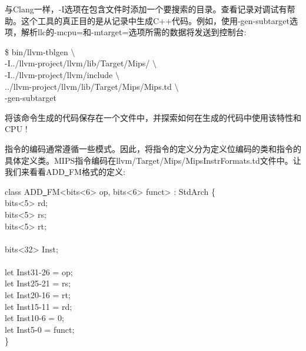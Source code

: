 与Clang一样，-I选项在包含文件时添加一个要搜索的目录。查看记录对调试有帮助。这个工具的真正目的是从记录中生成C++代码。例如，使用-gen-subtarget选项，解析llc的-mcpu=和-mtarget=选项所需的数据将发送到控制台:\par

\begin{tcolorbox}[colback=white,colframe=black]
\$ bin/llvm-tblgen $\setminus$ \\
\hspace*{0.5cm}-I../llvm-project/llvm/lib/Target/Mips/ $\setminus$ \\
\hspace*{0.5cm}-I../llvm-project/llvm/include $\setminus$ \\
\hspace*{0.5cm}../llvm-project/llvm/lib/Target/Mips/Mips.td $\setminus$ \\
\hspace*{0.5cm}-gen-subtarget
\end{tcolorbox}

将该命令生成的代码保存在一个文件中，并探索如何在生成的代码中使用该特性和CPU !\par

指令的编码通常遵循一些模式。因此，将指令的定义分为定义位编码的类和指令的具体定义类。MIPS指令编码在llvm/Target/Mips/MipsInstrFormats.td文件中。让我们来看看ADD\underline{~}FM格式的定义:\par

\begin{tcolorbox}[colback=white,colframe=black]
class ADD\underline{~}FM<bits<6> op, bits<6> funct> : StdArch \{ \\
\hspace*{0.5cm}	bits<5> rd; \\
\hspace*{0.5cm}	bits<5> rs; \\
\hspace*{0.5cm}	bits<5> rt; \\
\\
\hspace*{0.5cm}	bits<32> Inst; \\
\\
\hspace*{0.5cm}	let Inst{31-26} = op; \\
\hspace*{0.5cm}	let Inst{25-21} = rs; \\
\hspace*{0.5cm}	let Inst{20-16} = rt; \\
\hspace*{0.5cm}	let Inst{15-11} = rd; \\
\hspace*{0.5cm}	let Inst{10-6} = 0; \\
\hspace*{0.5cm}	let Inst{5-0} = funct; \\
\}
\end{tcolorbox}

